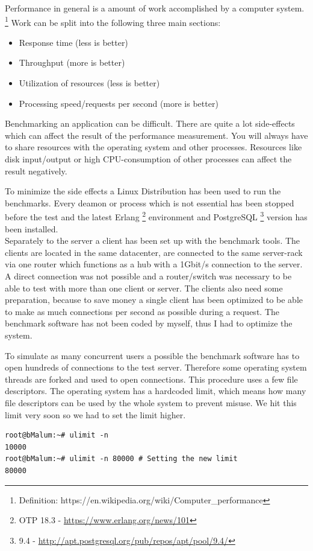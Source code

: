 \textcolor{newcode}{Performance in general is a amount of work accomplished by a computer system. \footnote{Definition: https://en.wikipedia.org/wiki/Computer\_performance} Work can be split into the following three main sections:}

\begin{itemize}
\item Response time (less is better)
\item Throughput (more is better)
\item Utilization of resources (less is better)
\item Processing speed/requests per second (more is better)
\end{itemize}


\textcolor{newcode}{Benchmarking an application can be difficult. There are quite a lot side-effects which can affect the result of the performance measurement. You will always have to share resources with the operating system and other processes. Resources like disk input/output or high CPU-consumption of other processes can affect the result negatively.}

\textcolor{newcode}{To minimize the side effects a Linux Distribution has been used to run the benchmarks. Every deamon or process which is not essential has been stopped before the test and the latest Erlang \footnote{OTP 18.3 - \url{https://www.erlang.org/news/101}} environment and PostgreSQL \footnote{9.4 - \url{http://apt.postgresql.org/pub/repos/apt/pool/9.4/}} version has been installed.}
\ \\ \newline
\textcolor{newcode}{Separately to the server a client has been set up with the benchmark tools. The clients are located in the same datacenter, are connected to the same server-rack via one router which functions as a hub with a 1Gbit/s connection to the server. A direct connection was not possible and a router/switch was necessary to be able to test with more than one client or server. The clients also need some preparation, because to save money a single client has been optimized to be able to make as much connections per second as possible during a request. The benchmark software has not been coded by myself, thus I had to optimize the system.}

\textcolor{newcode}{To simulate as many concurrent users a possible the benchmark software has to open hundreds of connections to the test server. Therefore some operating system threads are forked and used to open connections. This procedure uses a few file descriptors. The operating system has a hardcoded limit, which means how many file descriptors can be used by the whole system to prevent misuse. We hit this limit very soon so we had to set the limit higher.}
\begin{verbatim}
root@bMalum:~# ulimit -n
10000
root@bMalum:~# ulimit -n 80000 # Setting the new limit
80000
\end{verbatim}

